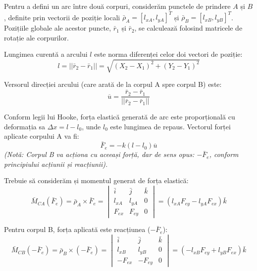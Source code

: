 \documentclass[12pt, a4paper]{article}
\begin{document}
Pentru a defini un arc între două corpuri, considerăm punctele de prindere $A$ și $B$, definite prin vectorii de poziție locali $\bar{\rho}_A = [l_{xA}, l_{yA}]^T$ și $\bar{\rho}_B = [l_{xB}, l_{yB}]^T$. 
Pozițiile globale ale acestor puncte, $\bar{r}_1$ și $\bar{r}_2$, se calculează folosind matricele de rotație ale corpurilor.

Lungimea curentă a arcului $l$ este norma diferenței celor doi vectori de poziție:
\begin{equation}
    l = ||\bar{r}_2 - \bar{r}_1|| = \sqrt{(X_2 - X_1)^2 + (Y_2 - Y_1)^2}
\end{equation}

Versorul direcției arcului (care arată de la corpul A spre corpul B) este:
\begin{equation}
    \overline{u} = \frac{\bar{r}_2 - \bar{r}_1}{||\bar{r}_2 - \bar{r}_1||}
\end{equation}

Conform legii lui Hooke, forța elastică generată de arc este proporțională cu deformația sa $\Delta x = l - l_0$, unde $l_0$ este lungimea de repaus. Vectorul forței aplicate corpului A va fi:
\begin{equation}
    \bar{F}_{e} = - k (l - l_0) \overline{u}
\end{equation}
\textit{(Notă: Corpul B va acționa cu aceeași forță, dar de sens opus: $-\bar{F}_{e}$, conform principiului acțiunii și reacțiunii).}

Trebuie să considerăm și momentul generat de forța elastică:
\begin{equation}
    \bar{M}_{CA}(\bar{F}_e) = \bar{\rho}_A \times \bar{F}_e = 
    \begin{vmatrix} 
    \bar{i} & \bar{j} & \bar{k} \\ 
    l_{xA} & l_{yA} & 0 \\ 
    F_{ex} & F_{ey} & 0 
    \end{vmatrix} 
    = (l_{xA} F_{ey} - l_{yA} F_{ex})\bar{k}
\end{equation}

Pentru corpul B, forța aplicată este reacțiunea ($-\bar{F}_e$):
\begin{equation}
    \bar{M}_{CB}(-\bar{F}_e) = \bar{\rho}_B \times (-\bar{F}_e) = 
    \begin{vmatrix} 
    \bar{i} & \bar{j} & \bar{k} \\ 
    l_{xB} & l_{yB} & 0 \\ 
    -F_{ex} & -F_{ey} & 0 
    \end{vmatrix} 
    = (-l_{xB} F_{ey} + l_{yB} F_{ex})\bar{k}
\end{equation}
\end{document}
